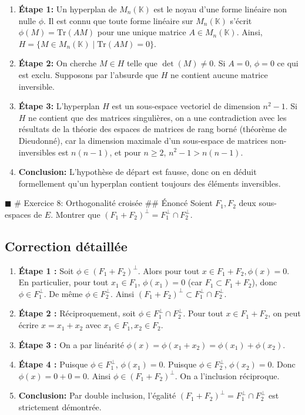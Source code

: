 \begin{enumerate}
\def\labelenumi{\arabic{enumi}.}
\tightlist
\item
  \textbf{Étape 1:} Un hyperplan de \(M_n(\mathbb{K})\) est le noyau
  d'une forme linéaire non nulle \(\phi\). Il est connu que toute forme
  linéaire sur \(M_n(\mathbb{K})\) s'écrit \(\phi(M) = \text{Tr}(AM)\)
  pour une unique matrice \(A \in M_n(\mathbb{K})\). Ainsi,
  \(H = \{ M \in M_n(\mathbb{K}) \mid \text{Tr}(AM) = 0 \}\).
\item
  \textbf{Étape 2:} On cherche \(M \in H\) telle que \(\det(M) \neq 0\).
  Si \(A=0\), \(\phi=0\) ce qui est exclu. Supposons par l'absurde que
  \(H\) ne contient aucune matrice inversible.
\item
  \textbf{Étape 3:} L'hyperplan \(H\) est un sous-espace vectoriel de
  dimension \(n^2-1\). Si \(H\) ne contient que des matrices
  singulières, on a une contradiction avec les résultats de la théorie
  des espaces de matrices de rang borné (théorème de Dieudonné), car la
  dimension maximale d'un sous-espace de matrices non-inversibles est
  \(n(n-1)\), et pour \(n \ge 2\), \(n^2-1 > n(n-1)\).
\item
  \textbf{Conclusion:} L'hypothèse de départ est fausse, donc on en
  déduit formellement qu'un hyperplan contient toujours des éléments
  inversibles.
\end{enumerate}

\(\blacksquare\) \# Exercice 8: Orthogonalité croisée \#\# Énoncé Soient
\(F_1, F_2\) deux sous-espaces de \(E\). Montrer que
\((F_1 + F_2)^\perp = F_1^\perp \cap F_2^\perp\).

\hypertarget{correction-duxe9tailluxe9e-7}{%
\subsection{Correction détaillée}\label{correction-duxe9tailluxe9e-7}}

\begin{enumerate}
\def\labelenumi{\arabic{enumi}.}
\tightlist
\item
  \textbf{Étape 1 :} Soit \(\phi \in (F_1 + F_2)^\perp\). Alors pour
  tout \(x \in F_1 + F_2, \phi(x)=0\). En particulier, pour tout
  \(x_1 \in F_1\), \(\phi(x_1)=0\) (car \(F_1 \subset F_1+F_2\)), donc
  \(\phi \in F_1^\perp\). De même \(\phi \in F_2^\perp\). Ainsi
  \((F_1 + F_2)^\perp \subset F_1^\perp \cap F_2^\perp\).
\item
  \textbf{Étape 2 :} Réciproquement, soit
  \(\phi \in F_1^\perp \cap F_2^\perp\). Pour tout \(x \in F_1+F_2\), on
  peut écrire \(x = x_1 + x_2\) avec \(x_1 \in F_1, x_2 \in F_2\).
\item
  \textbf{Étape 3 :} On a par linéarité
  \(\phi(x) = \phi(x_1+x_2) = \phi(x_1) + \phi(x_2)\).
\item
  \textbf{Étape 4 :} Puisque \(\phi \in F_1^\perp\), \(\phi(x_1)=0\).
  Puisque \(\phi \in F_2^\perp\), \(\phi(x_2)=0\). Donc
  \(\phi(x) = 0 + 0 = 0\). Ainsi \(\phi \in (F_1+F_2)^\perp\). On a
  l'inclusion réciproque.
\item
  \textbf{Conclusion:} Par double inclusion, l'égalité
  \((F_1 + F_2)^\perp = F_1^\perp \cap F_2^\perp\) est strictement
  démontrée.
\end{enumerate}

